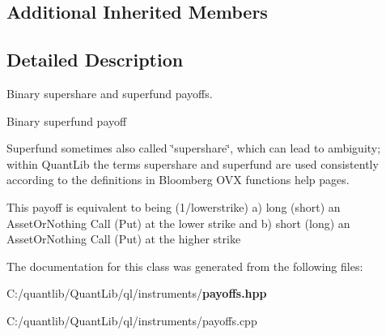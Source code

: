 \subsection*{Additional Inherited Members}


\subsection{Detailed Description}
Binary supershare and superfund payoffs. 

Binary superfund payoff

Superfund sometimes also called \char`\"{}supershare\char`\"{}, which can lead to ambiguity; within Quant\+Lib the terms supershare and superfund are used consistently according to the definitions in Bloomberg O\+VX function\textquotesingle{}s help pages.

This payoff is equivalent to being (1/lowerstrike) a) long (short) an Asset\+Or\+Nothing Call (Put) at the lower strike and b) short (long) an Asset\+Or\+Nothing Call (Put) at the higher strike 

The documentation for this class was generated from the following files\+:\begin{DoxyCompactItemize}
\item 
C\+:/quantlib/\+Quant\+Lib/ql/instruments/{\bf payoffs.\+hpp}\item 
C\+:/quantlib/\+Quant\+Lib/ql/instruments/payoffs.\+cpp\end{DoxyCompactItemize}
